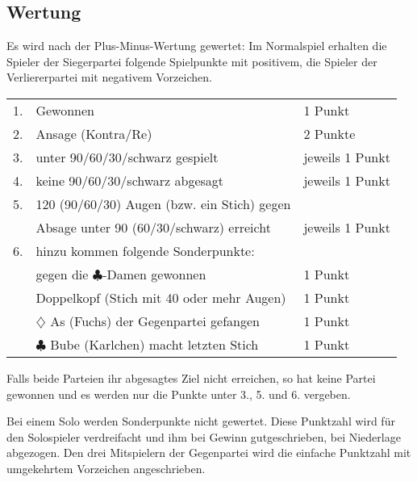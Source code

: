 \documentclass[12pt]{scrartcl}
\newcommand{\kreuz}{$\clubsuit$\xspace}
\newcommand{\karo}{$\diamondsuit$\xspace}
\begin{document}
\subsection{Wertung}
Es wird nach der Plus-Minus-Wertung gewertet: Im Normalspiel erhalten die Spieler der Siegerpartei folgende Spielpunkte mit positivem, die Spieler der Verliererpartei mit negativem Vorzeichen.
\begin{center}
  \begin{tabular}{lll}
    1. & Gewonnen & 1 Punkt \\
    2. & Ansage (Kontra/Re) & 2 Punkte\\
    3. & unter 90/60/30/schwarz gespielt & jeweils 1 Punkt\\
    4. & keine 90/60/30/schwarz abgesagt & jeweils 1 Punkt\\
    5. & 120 (90/60/30) Augen (bzw. ein Stich) gegen &\\
    &Absage unter 90 (60/30/schwarz) erreicht & jeweils 1 Punkt\\
    6. & hinzu kommen folgende Sonderpunkte: &\\
    & gegen die \kreuz -Damen gewonnen & 1 Punkt\\
    & Doppelkopf (Stich mit 40 oder mehr Augen) & 1 Punkt\\
    & \karo As (Fuchs) der Gegenpartei gefangen & 1 Punkt\\
    & \kreuz Bube (Karlchen) macht letzten Stich & 1 Punkt
  \end{tabular}
\end{center}
Falls beide Parteien ihr abgesagtes Ziel nicht erreichen, so hat keine Partei gewonnen und es werden nur die Punkte unter 3., 5. und 6. vergeben.

Bei einem Solo werden Sonderpunkte nicht gewertet. Diese Punktzahl wird für den Solospieler verdreifacht und ihm bei Gewinn gutgeschrieben, bei Niederlage abgezogen. Den drei Mitspielern der Gegenpartei wird die einfache Punktzahl mit umgekehrtem Vorzeichen angeschrieben.
\end{document}
